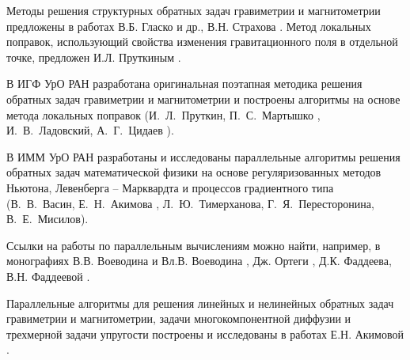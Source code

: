 {Методы решения структурных обратных задач гравиметрии и магнитометрии предложены в работах В.Б. Гласко и др.\cite{GlaOstFil1970}, В.Н. Страхова \cite{Str1967,Str1969,Str1974_1,Str1974_2,Str1976}. Метод локальных поправок, использующий свойства изменения гравитационного поля в отдельной точке, предложен И.Л. Пруткиным \cite{Pru1983,Pru1986,Prutdiss1998}.

В ИГФ УрО РАН разработана оригинальная поэтапная методика решения обратных задач гравиметрии и магнитометрии  и построены  алгоритмы на основе метода локальных поправок (И.~Л.~Пруткин, П.~С.~Мартышко \cite{MarPru1982,MarPrut2003}, И.~В.~Ладовский, А.~Г.~Цидаев \cite{MarLadTsi2010}).

В ИММ УрО РАН разработаны и исследованы параллельные алгоритмы решения обратных задач математической физики на основе регуляризованных методов Ньютона, Левенберга -- Марквардта и процессов градиентного типа (В.~В.~Васин, Е.~Н.~Акимова \cite{AkiVas2002,AkiVas2004}, Л.~Ю.~Тимерханова, Г.~Я.~Пересторонина, В.~Е.~Мисилов).

Ссылки на работы по параллельным вычислениям можно найти, например, в монографиях В.В. Воеводина и Вл.В. Воеводина \cite{VoeVoe2002}, Дж. Ортеги \cite{Ort1991}, Д.К. Фаддеева, В.Н. Фаддеевой \cite{FadFad1977}.

Параллельные алгоритмы для решения линейных и нелинейных обратных задач 
гравиметрии и магнитометрии, задачи многокомпонентной диффузии и трехмерной задачи упругости построены и исследованы в работах Е.Н. Акимовой \cite{Aki1994,Aki2001,AkiGorPop2005,Aki2009,Akidiss2009,AkiBel2011,AkiMisKos2015}.
}



